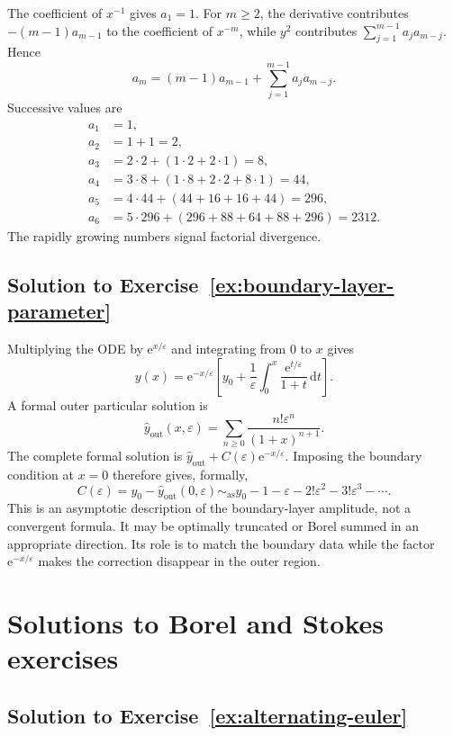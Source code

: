 \documentclass[11pt,oneside]{book}
\theoremstyle{definition}
\theoremstyle{remark}
\newcommand{\asympseries}{\sim_{\!\mathrm{as}}}
\newcommand{\e}{\mathrm{e}}
\newcommand{\dd}{\,\mathrm{d}}
\newcommand{\eps}{\varepsilon}
\begin{document}
The coefficient of $x^{-1}$ gives $a_1=1$. For $m\ge2$, the derivative
contributes $-(m-1)a_{m-1}$ to the coefficient of $x^{-m}$, while
$y^2$ contributes
$\sum_{j=1}^{m-1}a_ja_{m-j}$. Hence
\begin{equation}
  a_m=(m-1)a_{m-1}
      +\sum_{j=1}^{m-1}a_ja_{m-j}.
  \label{eq:solution-riccati-recurrence}
\end{equation}
Successive values are
\begin{align*}
  a_1&=1,\\
  a_2&=1+1=2,\\
  a_3&=2\cdot2+(1\cdot2+2\cdot1)=8,\\
  a_4&=3\cdot8+(1\cdot8+2\cdot2+8\cdot1)=44,\\
  a_5&=4\cdot44+(44+16+16+44)=296,\\
  a_6&=5\cdot296+(296+88+64+88+296)=2312.
\end{align*}
The rapidly growing numbers signal factorial divergence.

\subsection*{Solution to Exercise~\ref{ex:boundary-layer-parameter}}

Multiplying the ODE by $\e^{x/\eps}$ and integrating from $0$ to $x$ gives
\begin{equation}
  y(x)=\e^{-x/\eps}
  \left[y_0+\frac1\eps\int_0^x
    \frac{\e^{t/\eps}}{1+t}\dd t\right].
  \label{eq:boundary-exact-solution}
\end{equation}
A formal outer particular solution is
\[
  \widehat y_{\mathrm{out}}(x,\eps)
  =\sum_{n\ge0}\frac{n!\eps^n}{(1+x)^{n+1}}.
\]
The complete formal solution is
$\widehat y_{\mathrm{out}}+C(\eps)\e^{-x/\eps}$. Imposing the boundary condition
at $x=0$ therefore gives, formally,
\[
  C(\eps)=y_0-\widehat y_{\mathrm{out}}(0,\eps)
  \asympseries y_0-1-\eps-2!\eps^2-3!\eps^3-\cdots.
\]
This is an asymptotic description of the boundary-layer amplitude, not a
convergent formula. It may be optimally truncated or Borel summed in an
appropriate direction. Its role is to match the boundary data while the factor
$\e^{-x/\eps}$ makes the correction disappear in the outer region.

\section{Solutions to Borel and Stokes exercises}

\subsection*{Solution to Exercise~\ref{ex:alternating-euler}}
\end{document}
